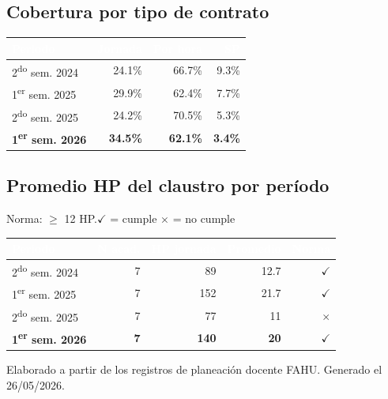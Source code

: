 \documentclass[11pt, a4paper]{article}
\begin{document}
\subsection{Cobertura por tipo de contrato}

\begin{tabular}{lrrr}
\toprule
\rowcolor{usachDark} \textbf{\textcolor{white}{Periodo}} & \textbf{\textcolor{white}{Jornada}} & \textbf{\textcolor{white}{Por hora}} & \textbf{\textcolor{white}{SP}} \\
\midrule
2\textsuperscript{do} sem. 2024 & 24.1\% & 66.7\% & 9.3\% \\
\rowcolor{rowEven}1\textsuperscript{er} sem. 2025 & 29.9\% & 62.4\% & 7.7\% \\
2\textsuperscript{do} sem. 2025 & 24.2\% & 70.5\% & 5.3\% \\
\rowcolor{rowHighlight}\textbf{1\textsuperscript{er} sem. 2026} & \textbf{34.5\%} & \textbf{62.1\%} & \textbf{3.4\%} \\
\bottomrule
\end{tabular}

\subsection{Promedio HP del claustro por período}

Norma: $\geq$ 12 HP.\quad$\checkmark$ = cumple \quad $\times$ = no cumple

\begin{tabular}{lrrrr}
\toprule
\rowcolor{usachDark} \textbf{\textcolor{white}{Periodo}} & \textbf{\textcolor{white}{N acad.}} & \textbf{\textcolor{white}{HP jornada}} & \textbf{\textcolor{white}{Promedio}} & \textbf{\textcolor{white}{Norma}} \\
\midrule
2\textsuperscript{do} sem. 2024 & 7 & 89 & 12.7 & $\checkmark$ \\
\rowcolor{rowEven}1\textsuperscript{er} sem. 2025 & 7 & 152 & 21.7 & $\checkmark$ \\
2\textsuperscript{do} sem. 2025 & 7 & 77 & 11 & $\times$ \\
\rowcolor{rowHighlight}\textbf{1\textsuperscript{er} sem. 2026} & \textbf{7} & \textbf{140} & \textbf{20} & \textbf{$\checkmark$} \\
\bottomrule
\end{tabular}

\vfill
{\footnotesize\color{gray} Elaborado a partir de los registros de planeación docente FAHU. Generado el 26/05/2026.}
\end{document}
